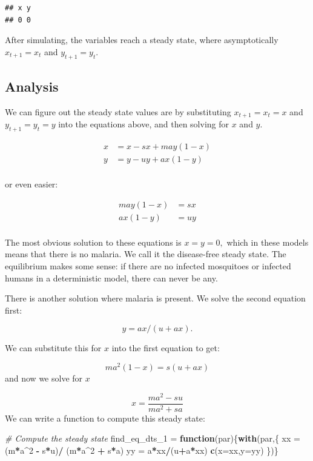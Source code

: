 \documentclass[
]{book}
\newenvironment{Shaded}{\begin{snugshade}}{\end{snugshade}}
\newcommand{\AttributeTok}[1]{\textcolor[rgb]{0.13,0.29,0.53}{#1}}
\newcommand{\CommentTok}[1]{\textcolor[rgb]{0.56,0.35,0.01}{\textit{#1}}}
\newcommand{\ControlFlowTok}[1]{\textcolor[rgb]{0.13,0.29,0.53}{\textbf{#1}}}
\newcommand{\DecValTok}[1]{\textcolor[rgb]{0.00,0.00,0.81}{#1}}
\newcommand{\FunctionTok}[1]{\textcolor[rgb]{0.13,0.29,0.53}{\textbf{#1}}}
\newcommand{\NormalTok}[1]{#1}
\newcommand{\OtherTok}[1]{\textcolor[rgb]{0.56,0.35,0.01}{#1}}
\newcommand{\SpecialCharTok}[1]{\textcolor[rgb]{0.81,0.36,0.00}{\textbf{#1}}}
\begin{document}
\begin{verbatim}
## x y 
## 0 0
\end{verbatim}

After simulating, the variables reach a steady state, where asymptotically \(x_{t+1} = x_t\) and \(y_{t+1} = y_t\).

\subsection{Analysis}\label{analysis}

We can figure out the steady state values are by substituting \(x_{t+1} = x_t = x\) and \(y_{t+1} = y_t = y\) into the equations above, and then solving for \(x\) and \(y\).

\[
\begin{array}{rl}
x &=  x - s x + m a y (1-x)  \\ 
y &=  y - u y + a x (1-y) \\ 
\end{array}
\]

or even easier:

\[\begin{array}{rl}
m a y (1-x) &=  s x \\ 
a x (1 - y) &=  u y\\ 
\end{array}\]

The most obvious solution to these equations is \(x=y=0,\) which in these models means that there is no malaria. We call it the disease-free steady state. The equilibrium makes some sense: if there are no infected mosquitoes or infected humans in a deterministic model, there can never be any.

There is another solution where malaria is present. We solve the second equation first:

\[y = a x / (u + a x).\]

We can substitute this for \(x\) into the first equation to get:

\[m a^2 (1-x) =  s (u+ax)\]
and now we solve for \(x\)

\[x = \frac{\textstyle{ma^2 - su}}{\textstyle{ma^2 + sa}}\]
We can write a function to compute this steady state:

\begin{Shaded}
\begin{Highlighting}[]
\CommentTok{\# Compute the steady state }
\NormalTok{find\_eq\_dts\_1 }\OtherTok{=} \ControlFlowTok{function}\NormalTok{(par)\{}\FunctionTok{with}\NormalTok{(par,\{}
\NormalTok{  xx }\OtherTok{=}\NormalTok{ (m}\SpecialCharTok{*}\NormalTok{a}\SpecialCharTok{\^{}}\DecValTok{2} \SpecialCharTok{{-}}\NormalTok{ s}\SpecialCharTok{*}\NormalTok{u)}\SpecialCharTok{/}\NormalTok{ (m}\SpecialCharTok{*}\NormalTok{a}\SpecialCharTok{\^{}}\DecValTok{2} \SpecialCharTok{+}\NormalTok{ s}\SpecialCharTok{*}\NormalTok{a)}
\NormalTok{  yy }\OtherTok{=}\NormalTok{ a}\SpecialCharTok{*}\NormalTok{xx}\SpecialCharTok{/}\NormalTok{(u}\SpecialCharTok{+}\NormalTok{a}\SpecialCharTok{*}\NormalTok{xx) }
  \FunctionTok{c}\NormalTok{(}\AttributeTok{x=}\NormalTok{xx,}\AttributeTok{y=}\NormalTok{yy)}
\NormalTok{\})\}}
\end{Highlighting}
\end{Shaded}
\end{document}
